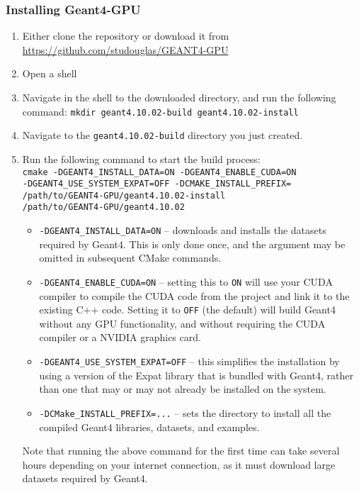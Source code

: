 \documentclass[12pt]{article}
\begin{document}
\subsubsection{Installing Geant4-GPU}
\begin{enumerate}
\item Either clone the repository or download it from \url{https://github.com/studouglas/GEANT4-GPU}
\item Open a shell
\item \label{StepMkdir} Navigate in the shell to the downloaded directory, and run the following command: \texttt{mkdir geant4.10.02-build geant4.10.02-install}
\item Navigate to the \texttt{geant4.10.02-build} directory you just created.
\item \label{StepCMake} Run the following command to start the build process:\\
\texttt{cmake -DGEANT4\_INSTALL\_DATA=ON -DGEANT4\_ENABLE\_CUDA=ON\\
 -DGEANT4\_USE\_SYSTEM\_EXPAT=OFF -DCMAKE\_INSTALL\_PREFIX=\\
 /path/to/GEANT4-GPU/geant4.10.02-install \\
 /path/to/GEANT4-GPU/geant4.10.02}
\begin{itemize}
\item \texttt{-DGEANT4\_INSTALL\_DATA=ON} -- downloads and installs the datasets required by Geant4. This is only done once, and the argument may be omitted in subsequent CMake commands.
\item \texttt{-DGEANT4\_ENABLE\_CUDA=ON} -- setting this to \texttt{ON} will use your CUDA compiler to compile the CUDA code from the project and link it to the existing C++ code. Setting it to \texttt{OFF} (the default) will build Geant4 without any GPU functionality, and without requiring the CUDA compiler or a NVIDIA graphics card.
\item \texttt{-DGEANT4\_USE\_SYSTEM\_EXPAT=OFF} -- this simplifies the installation by using a version of the Expat library that is bundled with Geant4, rather than one that may or may not already be installed on the system. 
\item \texttt{-DCMake\_INSTALL\_PREFIX=...} -- sets the directory to install all the compiled Geant4 libraries, datasets, and examples.
\end{itemize}
Note that running the above command for the first time can take several hours depending on your internet connection, as it must download large datasets required by Geant4.\\


\end{enumerate}
\end{document}
